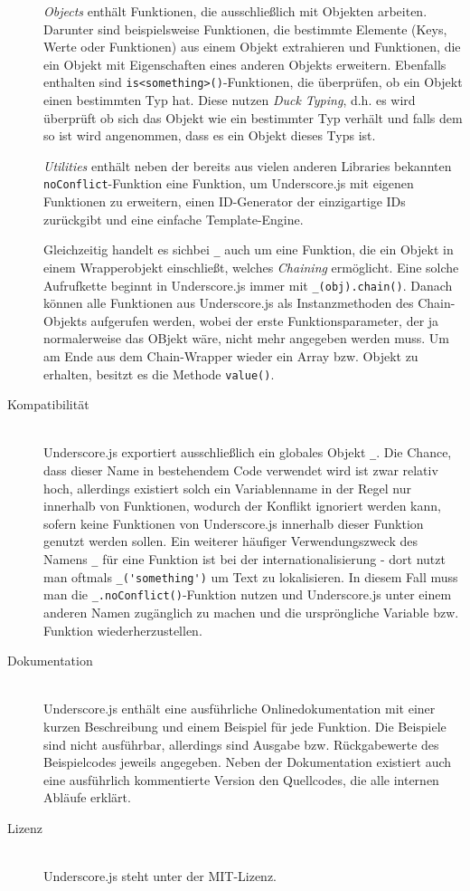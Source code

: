 \begin{description}
\emph{Objects} enthält Funktionen, die ausschließlich mit Objekten arbeiten. Darunter sind
beispielsweise Funktionen, die bestimmte Elemente (Keys, Werte oder Funktionen) aus einem Objekt
extrahieren und Funktionen, die ein Objekt mit Eigenschaften eines anderen Objekts erweitern.
Ebenfalls enthalten sind \lstinline{is<something>()}-Funktionen, die überprüfen, ob ein Objekt einen
bestimmten Typ hat. Diese nutzen \emph{Duck Typing}, d.h. es wird überprüft ob sich das Objekt wie
ein bestimmter Typ verhält und falls dem so ist wird angenommen, dass es ein Objekt dieses Typs ist.

\emph{Utilities} enthält neben der bereits aus vielen anderen Libraries bekannten
\lstinline{noConflict}-Funktion eine Funktion, um Underscore.js mit eigenen Funktionen zu erweitern,
einen ID-Generator der einzigartige IDs zurückgibt und eine einfache Template-Engine.

Gleichzeitig handelt es sichbei \lstinline{_} auch um eine Funktion, die ein Objekt in einem
Wrapperobjekt einschließt, welches \emph{Chaining} ermöglicht. Eine solche Aufrufkette beginnt in
Underscore.js immer mit \lstinline{_(obj).chain()}. Danach können alle Funktionen aus Underscore.js
als Instanzmethoden des Chain-Objekts aufgerufen werden, wobei der erste Funktionsparameter, der ja
normalerweise das OBjekt wäre, nicht mehr angegeben werden muss. Um am Ende aus dem Chain-Wrapper
wieder ein Array bzw. Objekt zu erhalten, besitzt es die Methode \lstinline{value()}.

\item[Kompatibilität] \hfill \\
Underscore.js exportiert ausschließlich ein globales Objekt \lstinline{_}. Die Chance, dass dieser
Name in bestehendem Code verwendet wird ist zwar relativ hoch, allerdings existiert solch ein
Variablenname in der Regel nur innerhalb von Funktionen, wodurch der Konflikt ignoriert werden kann,
sofern keine Funktionen von Underscore.js innerhalb dieser Funktion genutzt werden sollen. Ein
weiterer häufiger Verwendungszweck des Namens \lstinline{_} für eine Funktion ist bei der
internationalisierung - dort nutzt man oftmals \lstinline{_('something')} um Text zu lokalisieren.
In diesem Fall muss man die \lstinline{_.noConflict()}-Funktion nutzen und Underscore.js unter einem
anderen Namen zugänglich zu machen und die urspröngliche Variable bzw. Funktion wiederherzustellen.

\item[Dokumentation] \hfill \\
Underscore.js enthält eine ausführliche Onlinedokumentation mit einer kurzen Beschreibung und einem
Beispiel für jede Funktion. Die Beispiele sind nicht ausführbar, allerdings sind Ausgabe bzw.
Rückgabewerte des Beispielcodes jeweils angegeben. Neben der Dokumentation existiert auch eine
ausführlich kommentierte Version den Quellcodes, die alle internen Abläufe erklärt.

\item[Lizenz] \hfill \\
Underscore.js steht unter der MIT-Lizenz.
\end{description}
